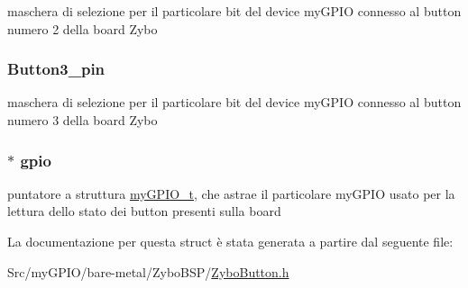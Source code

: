 maschera di selezione per il particolare bit del device my\+G\+P\+I\+O connesso al button numero 2 della board Zybo \hypertarget{struct_zybo_button__t_ad462a15a55883fd4c86d2be9e11968a7}{
\subsubsection[{Button3\+\_\+pin}]{ Button3\+\_\+pin}}\label{struct_zybo_button__t_ad462a15a55883fd4c86d2be9e11968a7}
maschera di selezione per il particolare bit del device my\+G\+P\+I\+O connesso al button numero 3 della board Zybo \hypertarget{struct_zybo_button__t_ac37ddc7c58d246d233dfb38037020184}{
\subsubsection[{gpio}]{$\ast$ gpio}}\label{struct_zybo_button__t_ac37ddc7c58d246d233dfb38037020184}
puntatore a struttura \hyperlink{structmy_g_p_i_o__t}{my\+G\+P\+I\+O\+\_\+t}, che astrae il particolare my\+G\+P\+I\+O usato per la lettura dello stato dei button presenti sulla board 

La documentazione per questa struct è stata generata a partire dal seguente file\+:\begin{DoxyCompactItemize}
\item 
Src/my\+G\+P\+I\+O/bare-\/metal/\+Zybo\+B\+S\+P/\hyperlink{_zybo_button_8h}{Zybo\+Button.\+h}\end{DoxyCompactItemize}
